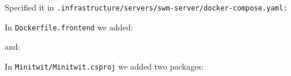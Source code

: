 Specified it in \texttt{.infrastructure/servers/swm-server/docker-compose.yaml:}

\begin{Shaded}
\begin{Highlighting}[]
\AttributeTok{  }\KeywordTok{:}
\AttributeTok{    }\KeywordTok{:}
\AttributeTok{    }\KeywordTok{:}
\AttributeTok{      }\KeywordTok{{-}}
\AttributeTok{    }\KeywordTok{:}
\AttributeTok{      }\KeywordTok{{-}}\AttributeTok{ }
\end{Highlighting}
\end{Shaded}

In \texttt{Dockerfile.frontend} we added:

\begin{Shaded}
\begin{Highlighting}[]
\end{Highlighting}
\end{Shaded}

and:


In \texttt{Minitwit/Minitwit.csproj} we added two packages:

\begin{Shaded}
\begin{Highlighting}[]
\OperatorTok{\textless{}}\OperatorTok{=}\OperatorTok{=} \OperatorTok{/\textgreater{}}
\end{Highlighting}
\end{Shaded}

\begin{Shaded}
\begin{Highlighting}[]
 \OperatorTok{\textless{}}\OperatorTok{=}\OperatorTok{=} \OperatorTok{/\textgreater{}}
\end{Highlighting}
\end{Shaded}

